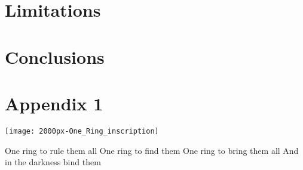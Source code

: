 \documentclass[11pt]{article}
\begin{document}
\section{Limitations}

\section{Conclusions}





 \section{Appendix 1}
 
\begin{minipage}[c]{0.6\textwidth}
\begin{framed}
\texttt{[image: 2000px-One\_Ring\_inscription]}
\end{framed}
\end{minipage}
\begin{minipage}[c]{0.4\textwidth}
\begin{framed}
 One ring to rule them all \newline
 One ring to find them \newline
 One ring to bring them all \newline
 And in the darkness bind them 
\end{framed}
\end{minipage}

\end{document}
